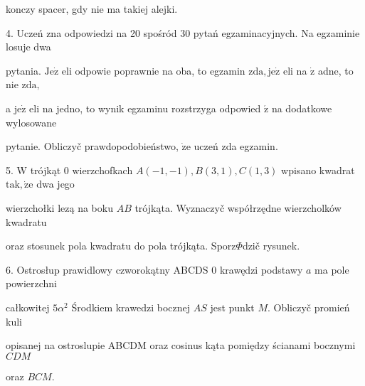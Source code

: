 \documentclass[a4paper,12pt]{article}
\begin{document}
konczy spacer, gdy nie ma takiej alejki.

4. Uczeń zna odpowiedzi na 20 spośród 30 pytań egzaminacyjnych. Na egzaminie losuje dwa

pytania. $\mathrm{J}\mathrm{e}\dot{\mathrm{z}}$ eli odpowie poprawnie na oba, to egzamin $\mathrm{z}\mathrm{d}\mathrm{a}, \mathrm{j}\mathrm{e}\dot{\mathrm{z}}$ eli na $\dot{\mathrm{z}}$ adne, to nie $\mathrm{z}\mathrm{d}\mathrm{a},$

a $\mathrm{j}\mathrm{e}\dot{\mathrm{z}}$ eli na jedno, to wynik egzaminu rozstrzyga odpowied $\acute{\mathrm{z}}$ na dodatkowe wylosowane

pytanie. Obliczyč prawdopodobieństwo, $\dot{\mathrm{z}}\mathrm{e}$ uczeń zda egzamin.

5. $\mathrm{W}$ trójkąt $0$ wierzchofkach $A(-1,-1), B(3,1), C(1,3)$ wpisano kwadrat $\mathrm{t}\mathrm{a}\mathrm{k}, \dot{\mathrm{z}}\mathrm{e}$ dwa jego

wierzchołki lezą na boku $AB$ trójkąta. Wyznaczyč współrzędne wierzcholków kwadratu

oraz stosunek pola kwadratu do pola trójkąta. Sporz$\Phi$dzič rysunek.

6. Ostrosłup prawidlowy czworokątny ABCDS $0$ krawędzi podstawy $a$ ma pole powierzchni

całkowitej $5\alpha^{2}$ Środkiem krawedzi bocznej $AS$ jest punkt $M$. Obliczyč promień kuli

opisanej na ostroslupie ABCDM oraz cosinus kąta pomiędzy ścianami bocznymi $CDM$

oraz $BCM.$
\end{document}
